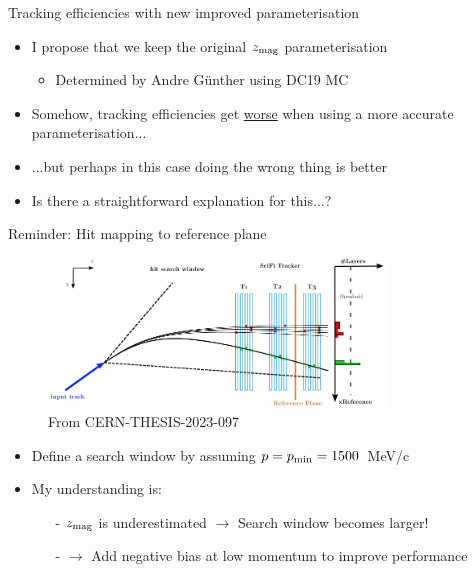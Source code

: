 \documentclass[xcolor={dvipsnames}]{beamer}
\begin{document}
\begin{frame}{Tracking efficiencies with new improved parameterisation}
  \vspace{0.0cm}
  \begin{itemize}
    \setlength\itemsep{1.0em}
    \item{I propose that we keep the original $z_{\rm mag}$ parameterisation}
    \begin{itemize}
      \item{Determined by Andre G{\"u}nther using DC19 MC}
    \end{itemize}
    \item{Somehow, tracking efficiencies get \underline{worse} when using a more accurate parameterisation...}
    \item{...but perhaps in this case doing the wrong thing is better}
    \item{Is there a straightforward explanation for this...?}
  \end{itemize}
\end{frame}

\begin{frame}{Reminder: Hit mapping to reference plane}
  \vspace{0.0cm}
  \begin{figure}[htb]
    \centering
    \includegraphics[width=0.8\textwidth]{Plots/HoughTransform.png}
  \caption*{\small From CERN-THESIS-2023-097}
  \end{figure}
  \vspace{-0.3cm}
  \begin{itemize}
    \item{Define a search window by assuming $p = p_{\rm min} = 1500$~MeV/c}
    \item{My understanding is:}
    \begin{itemize}
      \item[-]{$z_{\rm mag}$ is underestimated $\to$ Search window becomes larger!}
      \item[-]{$\to$ Add negative bias at low momentum to improve performance}
    \end{itemize}
  \end{itemize}
\end{frame}
\end{document}
